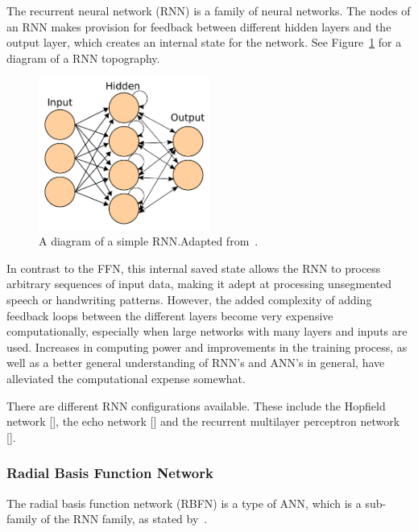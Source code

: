 The recurrent neural network (RNN) is a family of neural networks. The nodes of an RNN makes provision for feedback between different hidden layers and the output layer, which creates an internal state for the network. See Figure~\ref{fig:chap2-rnn-diagram} for a diagram of a RNN topography.

\begin{figure}
 \centering
 \includegraphics[width=0.5\textwidth]{figures/chapter2/rnn_diagram}
 \caption[A diagram of a simple RNN.]{A diagram of a simple RNN.\@ Adapted from~\cite{ann-wiki-pic}.}
\label{fig:chap2-rnn-diagram}
\end{figure}

In contrast to the FFN, this internal saved state allows the RNN to process arbitrary sequences of input data, making it adept at processing unsegmented speech or handwriting patterns. However, the added complexity of adding feedback loops between the different layers become very expensive computationally, especially when large networks with many layers and inputs are used. Increases in computing power and improvements in the training process, as well as a better general understanding of RNN's and ANN's in general, have alleviated the computational expense somewhat.

There are different RNN configurations available. These include the Hopfield network [\cite{hopfield1982neural}], the echo network [\cite{jaeger2001echo}] and the recurrent multilayer perceptron network [\cite{tutschku1995recurrent}].

\subsubsection{Radial Basis Function Network}

The radial basis function network (RBFN) is a type of ANN, which is a sub-family of the RNN family, as stated by~\cite{wilamowski1996implementation}. 

